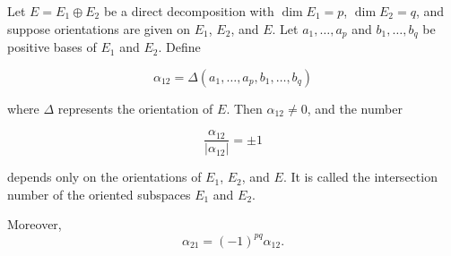 Let $E = E_1 \oplus E_2$ be a direct decomposition with $\dim E_1 = p$, $\dim E_2 = q$, and suppose orientations are given on $E_1$, $E_2$, and $E$. Let $a_1, \ldots, a_p$ and $b_1, \ldots, b_q$ be positive bases of $E_1$ and $E_2$. Define

$$\alpha_{12} = \Delta(a_1, \ldots, a_p, b_1, \ldots, b_q)$$

where $\Delta$ represents the orientation of $E$. Then $\alpha_{12} \neq 0$, and the number

$$\frac{\alpha_{12}}{|\alpha_{12}|} = \pm 1$$

depends only on the orientations of $E_1$, $E_2$, and $E$. It is called the intersection number of the oriented subspaces $E_1$ and $E_2$.

Moreover,
$$\alpha_{21} = (-1)^{p q} \alpha_{12}.$$
